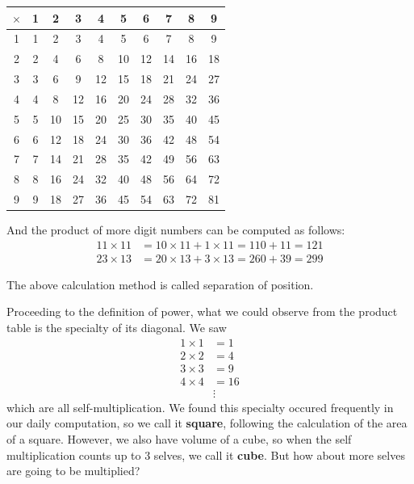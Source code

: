 \documentclass[12pt]{article}
\begin{document}
    \begin{center}
        \begin{tabular}{|c||c|c|c|c|c|c|c|c|c|}
            \hline
            $\times$&1&2&3&4&5&6&7&8&9\\
            \hline
            \hline
            1&1&2&3&4&5&6&7&8&9\\
            \hline
            2&2&4&6&8&10&12&14&16&18\\
            \hline
            3&3&6&9&12&15&18&21&24&27\\
            \hline
            4&4&8&12&16&20&24&28&32&36\\
            \hline
            5&5&10&15&20&25&30&35&40&45\\
            \hline
            6&6&12&18&24&30&36&42&48&54\\
            \hline
            7&7&14&21&28&35&42&49&56&63\\
            \hline
            8&8&16&24&32&40&48&56&64&72\\
            \hline
            9&9&18&27&36&45&54&63&72&81\\
            \hline
        \end{tabular}
    \end{center}

    And the product of more digit numbers can be computed as follows:\begin{align*}
        11\times 11&=10\times 11 + 1\times 11=110+11=121\\
        23\times 13&=20\times 13 + 3\times 13=260+39=299
    \end{align*}

    The above calculation method is called separation of position.

    Proceeding to the definition of power, what we could observe from the product table is the specialty of its diagonal. We saw\begin{align*}
        1\times 1&=1\\
        2\times 2&=4\\
        3\times 3&=9\\
        4\times 4&=16\\
        &\vdots
    \end{align*} 
    which are all self-multiplication. We found this specialty occured frequently in our daily computation, so we call it \textbf{square}, following the calculation of the area of a square. However, we also have volume of a cube, so when the self multiplication counts up to 3 selves, we call it \textbf{cube}. But how about more selves are going to be multiplied?
\end{document}
